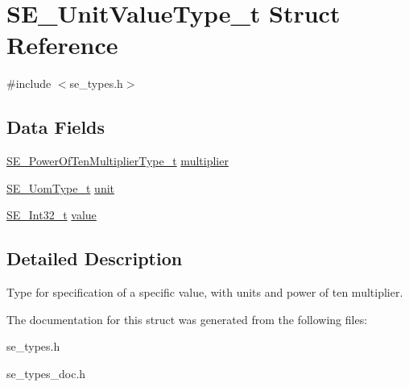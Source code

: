 \hypertarget{structSE__UnitValueType__t}{}\section{S\+E\+\_\+\+Unit\+Value\+Type\+\_\+t Struct Reference}
\label{structSE__UnitValueType__t}


{\ttfamily \#include $<$se\+\_\+types.\+h$>$}

\subsection*{Data Fields}
\begin{DoxyCompactItemize}
\item 
\hyperlink{group__PowerOfTenMultiplierType_gaf0317b781dc8dbb9cb6ac4e44a14fdef}{S\+E\+\_\+\+Power\+Of\+Ten\+Multiplier\+Type\+\_\+t} \hyperlink{group__UnitValueType_gad8cc28fe5b8c89ba39ea5a7f440dc024}{multiplier}
\item 
\hyperlink{group__UomType_ga35de8fcdea40d7edbdd341581cf651f1}{S\+E\+\_\+\+Uom\+Type\+\_\+t} \hyperlink{group__UnitValueType_ga1f1f3ce4391af53b2ef4dd5a3597efc4}{unit}
\item 
\hyperlink{group__Int32_gaa7afc819cfc8033c5fa408e34da8b71a}{S\+E\+\_\+\+Int32\+\_\+t} \hyperlink{group__UnitValueType_gaf0db03a368be714590179d34320e67b6}{value}
\end{DoxyCompactItemize}


\subsection{Detailed Description}
Type for specification of a specific value, with units and power of ten multiplier. 

The documentation for this struct was generated from the following files\+:\begin{DoxyCompactItemize}
\item 
se\+\_\+types.\+h\item 
se\+\_\+types\+\_\+doc.\+h\end{DoxyCompactItemize}
